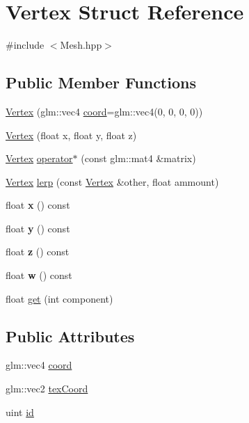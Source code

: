 \hypertarget{struct_vertex}{}\section{Vertex Struct Reference}
\label{struct_vertex}


{\ttfamily \#include $<$Mesh.\+hpp$>$}

\subsection*{Public Member Functions}
\begin{DoxyCompactItemize}
\item 
\hyperlink{struct_vertex_a314b0e4370b7b33efdaa4bf492b91021}{Vertex} (glm\+::vec4 \hyperlink{struct_vertex_aabc10e3b8e0171bcbe77b014944271b3}{coord}=glm\+::vec4(0, 0, 0, 0))
\item 
\hyperlink{struct_vertex_a2c558c054a0a2c970588c063073803a0}{Vertex} (float x, float y, float z)
\item 
\hyperlink{struct_vertex}{Vertex} \hyperlink{struct_vertex_a7b6c5132e8fd35a45481d8ba1e96d981}{operator$\ast$} (const glm\+::mat4 \&matrix)
\item 
\hyperlink{struct_vertex}{Vertex} \hyperlink{struct_vertex_ae3ede62e3d8f7614bead7becbeed065e}{lerp} (const \hyperlink{struct_vertex}{Vertex} \&other, float ammount)
\item 
\hypertarget{struct_vertex_a5aeac850629b2391834b1ea862cd3165}{}float {\bfseries x} () const \label{struct_vertex_a5aeac850629b2391834b1ea862cd3165}

\item 
\hypertarget{struct_vertex_ab7cbabc42312a9494a6889a0106889a2}{}float {\bfseries y} () const \label{struct_vertex_ab7cbabc42312a9494a6889a0106889a2}

\item 
\hypertarget{struct_vertex_ad643c72d7d0edb4763fa5de716e17228}{}float {\bfseries z} () const \label{struct_vertex_ad643c72d7d0edb4763fa5de716e17228}

\item 
\hypertarget{struct_vertex_a3b549b8c60d7530358e941a390196c54}{}float {\bfseries w} () const \label{struct_vertex_a3b549b8c60d7530358e941a390196c54}

\item 
float \hyperlink{struct_vertex_a9859cbbdd117fb2b59f56966f8a93e6e}{get} (int component)
\end{DoxyCompactItemize}
\subsection*{Public Attributes}
\begin{DoxyCompactItemize}
\item 
glm\+::vec4 \hyperlink{struct_vertex_aabc10e3b8e0171bcbe77b014944271b3}{coord}
\item 
glm\+::vec2 \hyperlink{struct_vertex_a8214ff52fee03a5524ce58c3810a1be9}{tex\+Coord}
\item 
uint \hyperlink{struct_vertex_aee423a6a530f42da4d6a9b306fc348e7}{id}
\end{DoxyCompactItemize}


